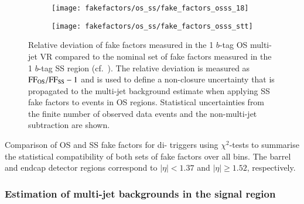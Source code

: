 \begin{figure}[htbp]
  \centering

  \begin{subfigure}[t]{0.48\textwidth}
    \texttt{[image: fakefactors/os\_ss/fake\_factors\_osss\_18]}
    \label{fig:fake_factor_OSSS_dtt}
  \end{subfigure}\hfill%
  \begin{subfigure}[t]{0.48\textwidth}
    \texttt{[image: fakefactors/os\_ss/fake\_factors\_osss\_stt]}
    \label{fig:fake_factor_OSSS_stt}
  \end{subfigure}

  \caption{Relative deviation of fake factors measured in the 1
    $b$-tag OS multi-jet VR compared to the nominal set of fake
    factors measured in the 1 $b$-tag SS region (cf.\
    ). The relative
    deviation is measured as $\text{FF}_\text{OS} / \text{FF}_\text{SS} - 1$ and
    is used to define a non-closure uncertainty that is propagated to
    the multi-jet background estimate when applying SS fake factors to
    events in OS regions. Statistical uncertainties from the finite
    number of observed data events and the non-multi-jet subtraction
    are shown.}
  \label{fig:fake_factor_OSSS}
\end{figure}


\begin{table}[htbp]
  \centering

  \caption{Comparison of OS and SS fake factors for di-\tauhadvis
    triggers using $\chi^2$-tests to summarise the statistical
    compatibility of both sets of fake factors over all \tauhadvis \pT
    bins. The barrel and endcap detector regions correspond to
    \tauhadvis $|\eta| < 1.37$ and $|\eta| \geq 1.52$, respectively.}%
  \label{tab:fake_factor_osss_chi2test}

  
\end{table}


\subsubsection{Estimation of multi-jet backgrounds in the signal region}

